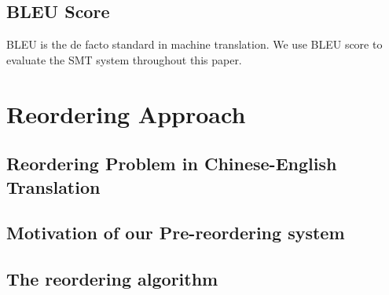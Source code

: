 \section{BLEU Score}
\label{ch:Foundations:sec:bleu}
BLEU is the de facto standard in machine translation\cite{metrics}. We use BLEU score to evaluate the SMT system throughout this paper.


\chapter{Reordering Approach}
\label{ch:ReorderingApproach}

\section{Reordering Problem in Chinese-English Translation}
\label{ch:ReorderingApproach:sec:Problem}

\section{Motivation of our Pre-reordering system}
\label{ch:ReorderingApproach:sec:Motivation}

\section{The reordering algorithm}
\label{ch:ReorderingApproach:sec:Algorithm}
